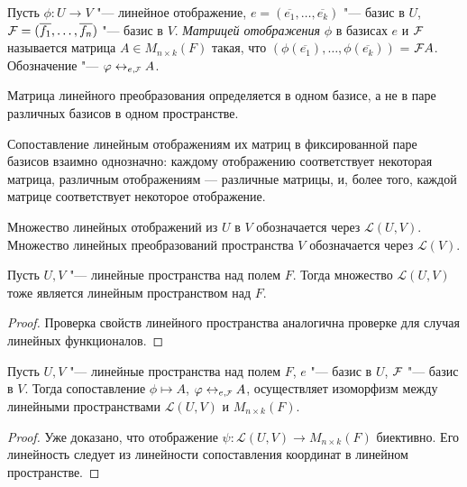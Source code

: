 \begin{definition}
	Пусть $\phi: U \rightarrow V$ "--- линейное отображение, $e = (\overline{e_1}, \dots, \overline{e_k})$ "--- базис в $U$, $\FF  = (\overline{f_1}, \dots, \overline{f_n})$ "--- базис в $V$. \textit{Матрицей отображения} $\phi$ в базисах $e$ и $\FF $ называется матрица $A \in M_{n \times k}(F)$ такая, что $(\phi(\overline{e_1}), \dotsc, \phi(\overline{e_k}))$ = $\FF A$. Обозначение "--- $\phi \leftrightarrow_{e, \FFF} A$.
\end{definition}

\begin{note}
	Матрица линейного преобразования определяется в одном базисе, а не в паре различных базисов в одном пространстве.
\end{note}

\begin{note}
	Сопоставление линейным отображениям их матриц в фиксированной паре базисов взаимно однозначно: каждому отображению соответствует некоторая матрица, различным отображениям --- различные матрицы, и, более того, каждой матрице соответствует некоторое отображение.
\end{note}

\begin{definition}
	Множество линейных отображений из $U$ в $V$ обозначается через $\mathcal{L}(U, V)$. Множество линейных преобразований пространства $V$ обозначается через $\mathcal{L}(V)$.
\end{definition}

\begin{proposition}
	Пусть $U, V$ "--- линейные пространства над полем $F$. Тогда множество $\mathcal{L}(U, V)$ тоже является линейным пространством над $F$.
\end{proposition}

\begin{proof}
	Проверка свойств линейного пространства аналогична проверке для случая линейных функционалов.
\end{proof}

\begin{proposition}
		Пусть $U, V$ "--- линейные пространства над полем $F$, $e$ "--- базис в $U$, $\FF$ "--- базис в $V$. Тогда сопоставление $\phi \mapsto A$, $\phi \leftrightarrow_{e, \FFF} A$, осуществляет изоморфизм между линейными пространствами $\mathcal{L}(U, V)$ и $M_{n\times k}(F)$.
\end{proposition}

\begin{proof}
	Уже доказано, что отображение $\psi : \mathcal{L}(U, V) \rightarrow M_{n\times k}(F)$ биективно. Его линейность следует из линейности сопоставления координат в линейном пространстве.
\end{proof}

